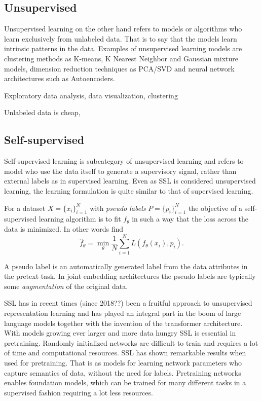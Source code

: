 \documentclass[../../thesis.tex]{subfiles}
\begin{document}
\subsection{Unsupervised}
Unsupervised learning on the other hand refers to models or algorithms who learn exclusively from unlabeled data. That is to say that the models learn intrinsic patterns in the data. Examples of unsupervised learning models are clustering methods as K-means, K Nearest Neighbor and Gaussian mixture models, dimension reduction techniques as PCA/SVD and neural network architectures such as Autoencoders. 


Exploratory data analysis, data visualization, clustering

Unlabeled data is cheap, 

\subsection{Self-supervised}
Self-supervised learning is subcategory of unsupervised learning and refers to model who use the data itself to generate a supervisory signal, rather than external labels as in supervised learning. Even as SSL is considered unsupervised learning, the learning formulation is quite similar to that of supervised learning.\newline

For a dataset $X = \{x_i\}_{i=1}^N$ with \textit{pseudo labels} $P = \{p_i\}_{i=1}^N$ the objective of a self-supervised learning algorithm is to fit $f_\theta$ in such a way that the loss across the data is minimized. In other words find 
\begin{equation}
    \widehat{f}_\theta = \min_\theta \frac{1}{N} \sum_{i=1}^N L(f_\theta(x_i),p_i).
\end{equation}

A pseudo label is an automatically generated label from the data attributes in the pretext task. In joint embedding architectures the pseudo labels are typically some \textit{augmentation} of the original data.\newline

SSL has in recent times (since 2018??) been a fruitful approach to unsupervised representation learning and has played an integral part in the boom of large language models together with the invention of the transformer architecture. With models growing ever larger and more data hungry SSL is essential in pretraining. Randomly initialized networks are difficult to train and requires a lot of time and computational resources. SSL has shown remarkable results when used for pretraining. That is as models for learning network parameters who capture semantics of data, without the need for labels. Pretraining networks enables foundation models, which can be trained for many different tasks in a supervised fashion requiring a lot less resources.\newline
\end{document}
